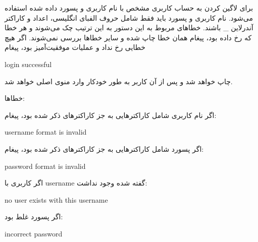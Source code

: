 \documentclass[]{article}
\begin{document}
برای لاگین کردن به حساب کاربری مشخص با نام کاربری و پسورد داده شده استفاده می‌شود. نام کاربری و پسورد باید فقط شامل حروف الفبای انگلیسی، اعداد و کاراکتر آندرلاین \_ باشند. خطاهای مربوط به این دستور به این ترتیب چک می‌شوند و هر خطا که رخ داده بود، پیغام همان خطا چاپ شده و سایر خطاها بررسی نمی‌شوند. اگر هیچ خطایی رخ نداد و عملیات موفقیت‌آمیز بود، پیغام


\begin{tcolorbox}[boxrule=0pt]
	\begin{latin}
  	  \large{
  	  	login successful
		}
	\end{latin}
\end{tcolorbox}

چاپ خواهد شد و پس از آن کاربر به طور خودکار وارد منوی اصلی خواهد شد.

خطاها: 

اگر نام کاربری شامل کاراکترهایی به جز کاراکترهای ذکر شده بود، پیغام:



\begin{tcolorbox}[boxrule=0pt]
	\begin{latin}
  	  \large{
  	  	username format is invalid
		}
	\end{latin}
\end{tcolorbox}

اگر پسورد شامل کاراکترهایی به جز کاراکترهای ذکر شده بود، پیغام:



\begin{tcolorbox}[boxrule=0pt]
	\begin{latin}
  	  \large{
  	  	password format is invalid
		}
	\end{latin}
\end{tcolorbox}

اگر کاربری با username گفته شده وجود نداشت:



\begin{tcolorbox}[boxrule=0pt]
	\begin{latin}
  	  \large{
  	  	no user exists with this username
		}
	\end{latin}
\end{tcolorbox}

اگر پسورد غلط بود:


\begin{tcolorbox}[boxrule=0pt]
	\begin{latin}
  	  \large{
  	  	incorrect password
		}
	\end{latin}
\end{tcolorbox}
\end{document}
